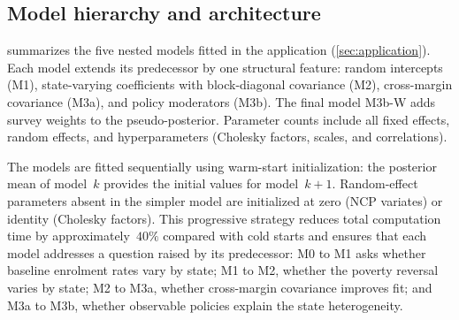 
\subsection{Model hierarchy and architecture}
\label{sme:model-hierarchy}

 summarizes the five nested models fitted in
the application (\cref{sec:application}).  Each model extends its
predecessor by one structural feature: random intercepts (M1),
state-varying coefficients with block-diagonal covariance (M2),
cross-margin covariance (M3a), and policy moderators (M3b).  The
final model M3b-W adds survey weights to the pseudo-posterior.
Parameter counts include all fixed effects, random effects, and
hyperparameters (Cholesky factors, scales, and correlations).

The models are fitted sequentially using warm-start initialization:
the posterior mean of model~$k$ provides the initial values for
model~$k+1$.  Random-effect parameters absent in the simpler model
are initialized at zero (NCP variates) or identity (Cholesky factors).
This progressive strategy reduces total computation time by
approximately~$40\%$ compared with cold starts and ensures that each
model addresses a question raised by its predecessor:
M0 to M1 asks whether baseline enrolment rates vary by state;
M1 to M2, whether the poverty reversal varies by state;
M2 to M3a, whether cross-margin covariance improves fit;
and M3a to M3b, whether observable policies explain the state
heterogeneity.

